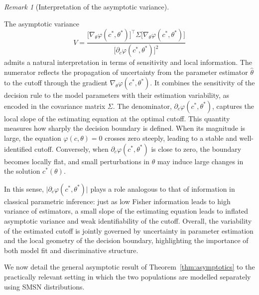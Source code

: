 \documentclass[11pt,a4paper]{article}
\theoremstyle{definition}
\theoremstyle{remark}
\newtheorem{remark}[theorem]{Remark}
\newcommand{\1}{\mathbf{1}}
\begin{document}
\begin{remark}[Interpretation of the asymptotic variance]
\label{rem:variance-interpretation} 

The asymptotic variance
\[
V
=
\frac{
\bigl[\nabla_\theta \varphi(c^*,\theta^*)\bigr]^\top
\Sigma
\bigl[\nabla_\theta \varphi(c^*,\theta^*)\bigr]
}{
\bigl[\partial_c \varphi(c^*,\theta^*)\bigr]^2
}
\]
admits a natural interpretation in terms of sensitivity and local information. The numerator reflects the propagation of uncertainty from the parameter estimator $\hat\theta$ to the cutoff through the gradient $\nabla_\theta \varphi(c^*,\theta^*)$. It combines the sensitivity of the decision rule to the model parameters with their estimation variability, as encoded in the covariance matrix $\Sigma$. The denominator, $\partial_c \varphi(c^*,\theta^*)$, captures the local slope of the estimating equation at the optimal cutoff. This quantity measures how sharply the decision boundary is defined. When its magnitude is large, the equation $\varphi(c,\theta)=0$ crosses zero steeply, leading to a stable and well-identified cutoff. Conversely, when $\partial_c \varphi(c^*,\theta^*)$ is close to zero, the boundary becomes locally flat, and small perturbations in $\theta$ may induce large changes in the solution $c^*(\theta)$.

In this sense, $\bigl|\partial_c\varphi(c^*,\theta^*)\bigr|$
plays a role analogous to that of information in classical
parametric inference: just as low Fisher information leads to high variance of estimators, a small slope of the estimating equation leads to inflated asymptotic variance and weak identifiability of the cutoff.
Overall, the variability of the estimated cutoff is jointly governed by uncertainty in parameter estimation and the local geometry of the decision boundary, highlighting the importance of both model fit and discriminative structure.
\end{remark}

We now detail the general asymptotic result of Theorem~\ref{thm:asymptotics} to the practically relevant setting in which the two populations are modelled separately using SMSN distributions.
\end{document}
